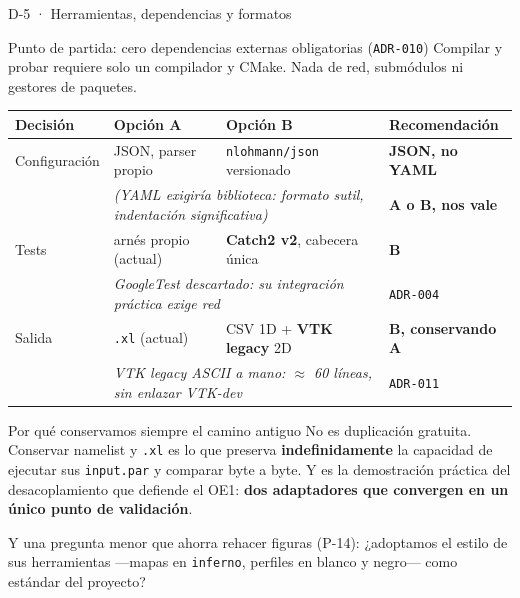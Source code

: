 \documentclass[aspectratio=169,10pt]{beamer}
\newcommand{\cod}[1]{\texttt{\small #1}}
\begin{document}
\begin{frame}[shrink]{D-5 · Herramientas, dependencias y formatos}

  \begin{block}{Punto de partida: cero dependencias externas obligatorias (\cod{ADR-010})}
    \scriptsize
    Compilar y probar requiere solo un compilador y CMake. Nada de red,
    submódulos ni gestores de paquetes.
  \end{block}

  \centering\scriptsize
  \begin{tabular}{@{}llll@{}}
    \toprule
    \textbf{Decisión} & \textbf{Opción A} & \textbf{Opción B} & \textbf{Recomendación} \\
    \midrule
    Configuración & JSON, parser propio & \cod{nlohmann/json} versionado & \textbf{JSON, no YAML} \\
                  & \multicolumn{2}{l}{\emph{(YAML exigiría biblioteca: formato sutil, indentación significativa)}} & \textbf{A o B, nos vale} \\
    \midrule
    Tests & arnés propio (actual) & \textbf{Catch2 v2}, cabecera única & \textbf{B} \\
          & \multicolumn{2}{l}{\emph{GoogleTest descartado: su integración práctica exige red}} & \cod{ADR-004} \\
    \midrule
    Salida & \cod{.xl} (actual) & CSV 1D + \textbf{VTK legacy} 2D & \textbf{B, conservando A} \\
           & \multicolumn{2}{l}{\emph{VTK legacy ASCII a mano: $\approx$ 60 líneas, sin enlazar VTK-dev}} & \cod{ADR-011} \\
    \bottomrule
  \end{tabular}

  \vspace{0.5em}
  \begin{exampleblock}{Por qué conservamos siempre el camino antiguo}
    \scriptsize
    No es duplicación gratuita. Conservar namelist y \cod{.xl} es lo que preserva
    \textbf{indefinidamente} la capacidad de ejecutar sus \cod{input.par} y
    comparar byte a byte. Y es la demostración práctica del desacoplamiento que
    defiende el OE1: \textbf{dos adaptadores que convergen en un único punto de
    validación}.
  \end{exampleblock}

  \begin{center}\scriptsize
    Y una pregunta menor que ahorra rehacer figuras (P-14): ¿adoptamos el estilo de
    sus herramientas —mapas en \cod{inferno}, perfiles en blanco y negro— como
    estándar del proyecto?
  \end{center}
\end{frame}
\end{document}
